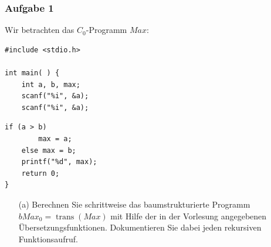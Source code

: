 \documentclass{beamer}
\DeclareMathOperator{\trans}{trans}
\begin{document}



\begin{frame}[fragile] \frametitle{Aufgabe 1}
	Wir betrachten das $C_0$-Programm $Max$:
	\begin{minipage}{\dimexpr0.5\linewidth-\fboxrule-\fboxsep}
		\begin{lstlisting}
#include <stdio.h>

int main( ) {
	int a, b, max;
	scanf("%i", &a);
	scanf("%i", &a);
		\end{lstlisting}
	\end{minipage}
	\begin{minipage}{\dimexpr0.5\linewidth-\fboxrule-\fboxsep}
		\begin{lstlisting}[firstnumber=7]
	if (a > b) 
		max = a;
	else max = b;
	printf("%d", max);
	return 0;
}
		\end{lstlisting}
	\end{minipage}

	\begin{itemize}
		\item[(a)] Berechnen Sie schrittweise das baumstrukturierte Programm $bMax_0 = \trans(Max)$ mit Hilfe der in der Vorlesung angegebenen Übersetzungsfunktionen. Dokumentieren Sie dabei jeden rekursiven Funktionsaufruf.
	\end{itemize}
\end{frame}
\end{document}
